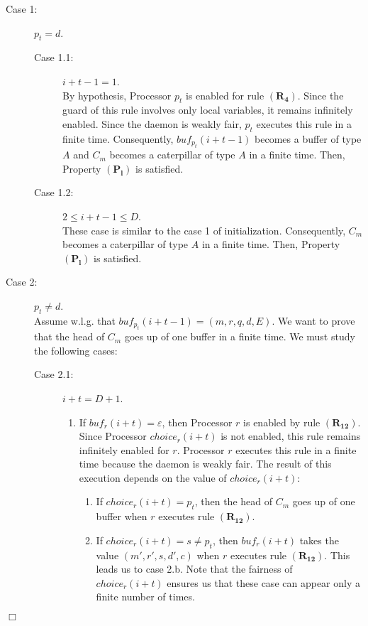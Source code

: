 \documentclass[11pt]{article}
\newenvironment{proof}{{\noindent\bf Proof. } }{{\hfill $\Box$}}
\begin{document}
\begin{proof}
\begin{description}
\begin{description}
\item [Case 1:] $p_{t}=d$.

\begin{description}
\item [Case 1.1:] $i+t-1=1$.\\
By hypothesis, Processor $p_{t}$ is enabled for rule $\boldsymbol{(R_{4})}$. Since the guard of this rule involves only local variables, it remains infinitely enabled. Since the daemon is weakly fair, $p_{t}$ executes this rule in a finite time. Consequently, $buf_{p_{t}}(i+t-1)$ becomes a buffer of type $A$ and $C_{m}$ becomes a caterpillar of type $A$ in a finite time. Then, Property $\boldsymbol{(P_{l})}$ is satisfied.
\item [Case 1.2:] $2\leq i+t-1\leq D$.\\
These case is similar to the case 1 of initialization. Consequently, $C_{m}$ becomes a caterpillar of type $A$ in a finite time. Then, Property $\boldsymbol{(P_{l})}$ is satisfied.
\end{description}

\item [Case 2:] $p_{t}\neq d$.\\


Assume w.l.g. that $buf_{p_{t}}(i+t-1)=(m,r,q,d,E)$. We want to prove that the head of $C_{m}$ goes up of one buffer in a finite time. We must study the following cases:

\begin{description}
\item [Case 2.1:] $i+t=D+1$.\\

\begin{enumerate}
\item If $buf_{r}(i+t)=\varepsilon$, then Processor $r$ is enabled by rule $\boldsymbol{(R_{12})}$. Since Processor $choice_{r}(i+t)$ is not enabled, this rule remains infinitely enabled for $r$. Processor $r$ executes this rule in a finite time because the daemon is weakly fair. The result of this execution depends on the value of $choice_{r}(i+t)$:

\begin{enumerate}
\item If $choice_{r}(i+t)=p_{t}$, then the head of $C_{m}$ goes up of one buffer when $r$ executes rule $\boldsymbol{(R_{12})}$.
\item If $choice_{r}(i+t)=s\neq p_{t}$, then $buf_{r}(i+t)$ takes the value $(m',r',s,d',c)$ when $r$ executes rule $\boldsymbol{(R_{12})}$. This leads us to case 2.b. Note that the fairness of  $choice_{r}(i+t)$ ensures us that these case can appear only a finite number of times.
\end{enumerate}


\end{enumerate}
\end{description}
\end{description}
\end{description}
\end{proof}
\end{document}
